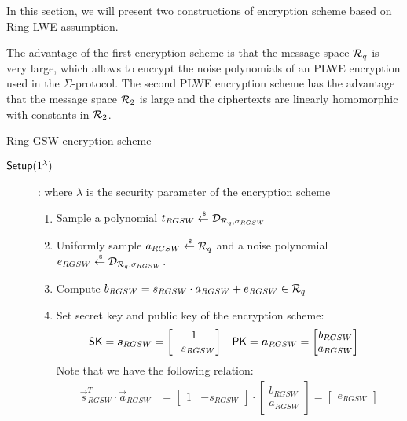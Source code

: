 In this section, we will present two constructions of encryption scheme based on Ring-LWE assumption.

The advantage of the first encryption scheme is that the message space ${\mathcal{R}}_q$ is very large, which allows to encrypt the noise polynomials of an PLWE encryption used in the $\Sigma$-protocol.
The second PLWE encryption scheme has the advantage that the message space ${\mathcal{R}}_2$ is large and the ciphertexts are linearly homomorphic with constants in ${\mathcal{R}}_2$.


\begin{subsection}{Ring-GSW encryption scheme~\cite{DBLP:journals/tc/KhedrGV16}}
  \begin{description}
  \item[${\mathsf{Setup}}(1^\lambda)$]: where $\lambda$ is the security parameter of the encryption scheme
    \begin{enumerate}
    \item Sample a polynomial $t_{RGSW} \stackrel{{\scriptscriptstyle \mkern4mu \$}}{\gets} \mathcal{D}_{{\mathcal{R}}_q, \sigma_{RGSW}}$
    \item Uniformly sample $a_{RGSW} \stackrel{{\scriptscriptstyle \mkern4mu \$}}{\gets} {\mathcal{R}}_q$ and a noise polynomial $e_{RGSW} \stackrel{{\scriptscriptstyle \mkern4mu \$}}{\gets} \mathcal{D}_{{\mathcal{R}}_q, \sigma_{RGSW}}$.
    \item Compute $b_{RGSW} = s_{RGSW} \cdot a_{RGSW} + e_{RGSW} \in {\mathcal{R}}_q$
    \item Set secret key and public key of the encryption scheme:
      \begin{align*}
        \SK &= \vec{s}_{RGSW} =\begin{bmatrix} 1 \\ -s_{RGSW} \end{bmatrix}  & \PK &= \vec{a}_{RGSW} =  \begin{bmatrix} b_{RGSW} \\ a_{RGSW}\end{bmatrix}
      \end{align*}
      Note that we have the following relation:
      \begin{align*}
        \vec{s}_{RGSW}^T \cdot \vec{a}_{RGSW} &= \begin{bmatrix} 1 & -s_{RGSW} \end{bmatrix} \cdot \begin{bmatrix} b_{RGSW} \\ a_{RGSW}\end{bmatrix} = \begin{bmatrix} e_{RGSW} \end{bmatrix}

\end{align*}
\end{enumerate}
\end{description}
\end{subsection}
